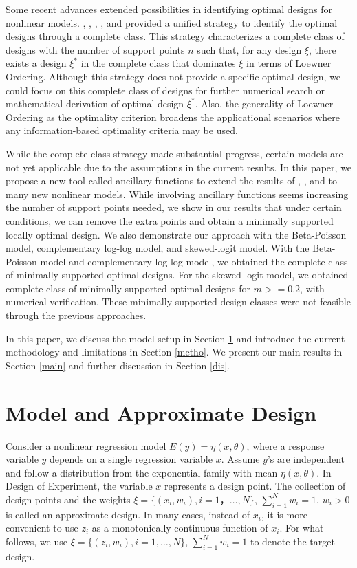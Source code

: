 \documentclass[12pt]{amsart}
\theoremstyle{definition}
\theoremstyle{remark}
\numberwithin{equation}{section}
\begin{document}
Some recent advances extended possibilities in identifying optimal designs for nonlinear models. \cite{yang2009}, \cite{yang2010}, \cite{dette2011}, \cite{yang2012}, and \cite{dette2013} provided a unified strategy to identify the optimal designs through a complete class. This strategy characterizes a complete class of designs with the number of support points $n$ such that, for any design $\xi$, there exists a design $\xi^*$ in the complete class that dominates $\xi$ in terms of Loewner Ordering. Although this strategy does not provide a specific optimal design, we could focus on this complete class of designs for further numerical search or mathematical derivation of optimal design $\xi^*$. Also, the generality of Loewner Ordering as the optimality criterion broadens the applicational scenarios where any information-based optimality criteria may be used.


While the complete class strategy made substantial progress, certain models are not yet applicable due to the assumptions in the current results. In this paper, we propose a new tool called ancillary functions to extend the results of \cite{yang2009}, \cite{yang2010}, and \cite{yang2012} to many new nonlinear models. While involving ancillary functions seems increasing the number of support points needed, we show in our results that under certain conditions, we can remove the extra points and obtain a minimally supported locally optimal design. We also demonstrate our approach with the Beta-Poisson model, complementary log-log model, and skewed-logit model. With the Beta-Poisson model and complementary log-log model, we obtained the complete class of minimally supported optimal designs. For the skewed-logit model, we obtained complete class of minimally supported optimal designs for $m>=0.2$, with numerical verification. These minimally supported design classes were not feasible through the previous approaches.  
 
In this paper, we discuss the model setup in Section \ref{2} and introduce the current methodology and limitations in Section \ref{metho}. We present our main results in Section \ref{main} and further discussion in Section \ref{dis}. 


\section{Model and Approximate Design}\label{2}
Consider a nonlinear regression model $ E(y) = \eta(x,\theta)$, where a response variable $y$ depends on a single regression variable $x$. Assume $y$'s are independent and follow a distribution from the exponential family with mean  $\eta(x,\theta)$. In Design of Experiment, the variable $x$ represents a design point. The collection of design points and the weights $\xi = \{(x_i,w_i), i=1， \ldots,N\}$, $\sum_{i=1}^Nw_i = 1$, $w_i> 0$ is called an approximate design. In many cases, instead of $x_i$, it is more convenient to use $z_i$ as a monotonically continuous function of $x_i$. For what follows, we use $\xi = \{(z_i,w_i), i=1, \ldots,N\}$, $\sum_{i=1}^Nw_i = 1$ to denote the target design. 
\end{document}
